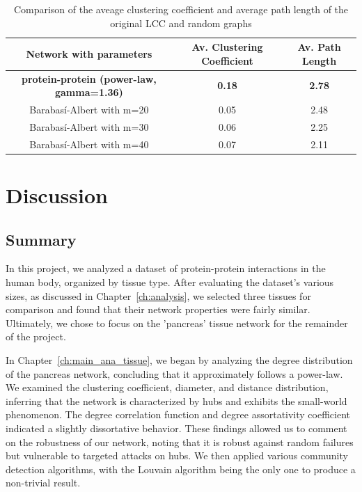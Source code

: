 \documentclass[paper=a4,fontsize=11pt,DIV=8,BCOR=5mm,oneside,pdftex,bibtotocnumbered]{scrreprt}
\theoremstyle{plain}
\begin{document}
	\begin{table}
		\caption{Comparison of the aveage clustering coefficient and average path length of the original LCC and random graphs}
		\centering
		\begin{tabular}{|c||c|c|}
			\hline
			Network with parameters& Av. Clustering Coefficient & Av. Path Length \\
			\hline
			\textbf{protein-protein (power-law, gamma=1.36)} & \textbf{0.18} & \textbf{2.78}\\
			\hline
			Barabasí-Albert with m=20 & 0.05 & 2.48 \\
			Barabasí-Albert with m=30 & 0.06 & 2.25 \\
			Barabasí-Albert with m=40 & 0.07 & 2.11 \\
			
			\hline
		\end{tabular}
		
		\label{tab:comp_ba}
	\end{table}
	
	\chapter{Discussion}\label{ch:discussion}
	\section{Summary}
	In this project, we analyzed a dataset of protein-protein interactions in the human body, organized by tissue type. After evaluating the dataset's various sizes, as discussed in Chapter~\ref{ch:analysis}, we selected three tissues for comparison and found that their network properties were fairly similar. Ultimately, we chose to focus on the 'pancreas' tissue network for the remainder of the project.
	
	In Chapter~\ref{ch:main_ana_tissue}, we began by analyzing the degree distribution of the pancreas network, concluding that it approximately follows a power-law. We examined the clustering coefficient, diameter, and distance distribution, inferring that the network is characterized by hubs and exhibits the small-world phenomenon. The degree correlation function and degree assortativity coefficient indicated a slightly dissortative behavior. These findings allowed us to comment on the robustness of our network, noting that it is robust against random failures but vulnerable to targeted attacks on hubs. We then applied various community detection algorithms, with the Louvain algorithm being the only one to produce a non-trivial result.
	
\end{document}

